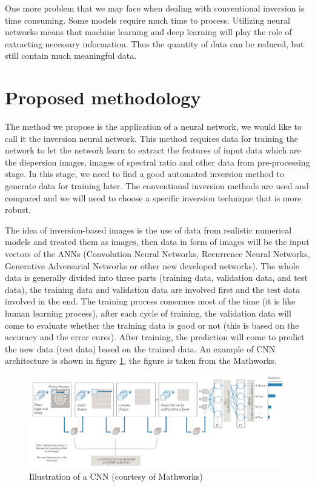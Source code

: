 One more problem that we may face when dealing with conventional inversion is time consuming. Some models require much time to process. Utilizing neural networks means that machine learning and deep learning will play the role of extracting necessary information. Thus the quantity of data can be reduced, but still contain much meaningful data. 

\section*{Proposed methodology}

The method we propose is the application of a neural network, we would like to call it the inversion neural network. This method requires data for training the network to let the network learn to extract the features of input data which are the dispersion images, images of spectral ratio and other data from pre-processing stage. In this stage, we need to find a good automated inversion method to generate data for training later. The conventional inversion methods are used and compared and we will need to choose a specific inversion technique that is more robust.

The idea of inversion-based images is the use of data from realistic numerical models and treated them as images, then data in form of images will be the input vectors of the ANNs (Convolution Neural Networks, Recurrence Neural Networks, Generative Adversarial Networks or other new developed networks). The whole data is generally divided into three parts (training data, validation data, and test data), the training data and validation data are involved first and the test data involved in the end. The training process consumes most of the time (it is like human learning process), after each cycle of training, the validation data will come to evaluate whether the training data is good or not (this is based on the accuracy and the error cures). After training, the prediction will come to predict the new data (test data) based on the trained data. An example of CNN architecture is shown in figure \ref{fig:CNN}, the figure is taken from the Mathworks. 


\begin{figure}
    \centering
    \includegraphics[scale=0.4]{images/CNN.png}
    \caption{Illustration of a CNN (courtesy of Mathworks)}
    \label{fig:CNN}
\end{figure}

